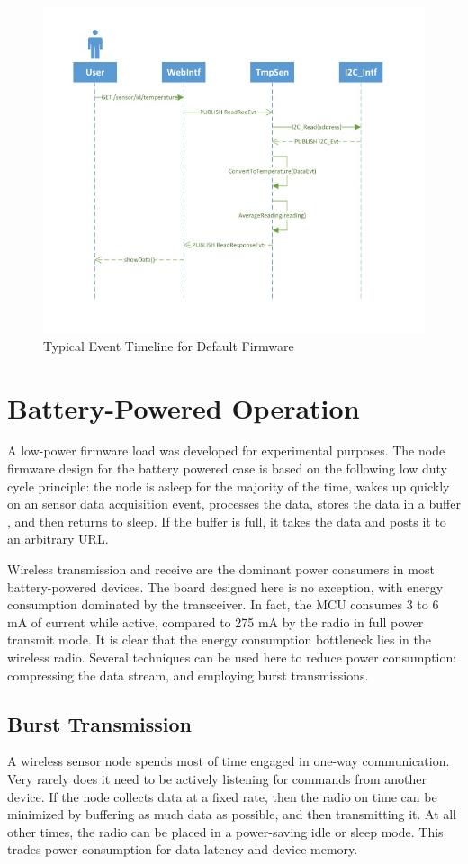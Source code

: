 \begin{figure}[h]
\centering
\includegraphics[width=0.7\linewidth]{images/softwareflow}
\caption[Firmware Event Timeline]{Typical Event Timeline for Default Firmware}
\label{fig:softwareflow}
\end{figure}

\section{Battery-Powered Operation}

A low-power firmware load was developed for experimental purposes. The node firmware design for the battery powered case is based on the following low duty cycle principle: the node is asleep for the majority of the time, wakes up quickly on an sensor data acquisition event, processes the data, stores the data in a buffer , and then returns to sleep. If the buffer is full, it takes the data and posts it to an arbitrary URL. 

Wireless transmission and receive are the dominant power consumers in most battery-powered devices. The board designed here is no exception, with energy consumption dominated by the transceiver. In fact, the MCU consumes 3 to 6 mA of current while active, compared to 275 mA by the radio in full power transmit mode. It is clear that the energy consumption bottleneck lies in the wireless radio. Several techniques can be used here to reduce power consumption: compressing the data stream, and employing burst transmissions.

\subsection{Burst Transmission}

A wireless sensor node spends most of time engaged in one-way communication. Very rarely does it need to be actively listening for commands from another device. If the node collects data at a fixed rate, then the radio on time can be minimized by buffering as much data as possible, and then transmitting it. At all other times, the radio can be placed in a power-saving idle or sleep mode. This trades power consumption for data latency and device memory.

